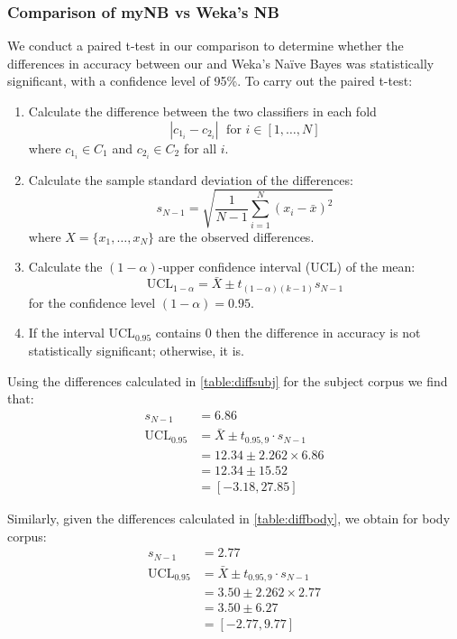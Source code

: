 \documentclass[10pt, a4paper]{article}
\begin{document}
\subsubsection{Comparison of myNB vs Weka's NB}\label{sec:t-test}

We conduct a paired t-test in our comparison to determine whether the differences in accuracy between our and Weka's Na\"ive Bayes was statistically significant, with a confidence level of 95\%. To carry out the paired t-test:

\begin{enumerate}
\item Calculate the difference between the two classifiers in each fold
$$ | c_{1_i} - c_{2_i} | \; \text{ for } i \in [1,\dots,N] $$
where $c_{1_i} \in C_1$ and $c_{2_i} \in C_2$ for all $i$.

\item Calculate the sample standard deviation of the differences:
$$ s_{N-1} = \sqrt{ \frac{1}{N-1} \sum_{i=1}^N (x_i-\bar{x})^2 } $$
where $X=\{ x_1,\dots,x_N \}$ are the observed differences.

\item Calculate the $(1-\alpha)$-upper confidence interval (UCL) of the mean:
$$ \text{UCL}_{1-\alpha} = \bar{X} \pm t_{(1-\alpha)(k-1)} s_{N-1} $$
for the confidence level $(1-\alpha)=0.95$.

\item If the interval $\text{UCL}_{0.95}$ contains 0 then the difference in accuracy is not statistically significant; otherwise, it is.
\end{enumerate}

Using the differences calculated in \autoref{table:diffsubj} for the subject corpus we find that:
\begin{align*}
s_{N-1} &= 6.86 \\
\text{UCL}_{0.95} &= \bar{X} \pm t_{0.95,9} \cdot s_{N-1} \\
  &= 12.34 \pm 2.262 \times 6.86 \\
  &= 12.34 \pm 15.52 \\
  &= [-3.18, 27.85]
\end{align*}

Similarly, given the differences calculated in \autoref{table:diffbody}, we obtain for body corpus:
\begin{align*}
s_{N-1} &= 2.77 \\
\text{UCL}_{0.95} &= \bar{X} \pm t_{0.95,9} \cdot s_{N-1} \\
  &= 3.50 \pm 2.262 \times 2.77 \\
  &= 3.50 \pm 6.27 \\
  &= [-2.77, 9.77]
\end{align*}
\end{document}
